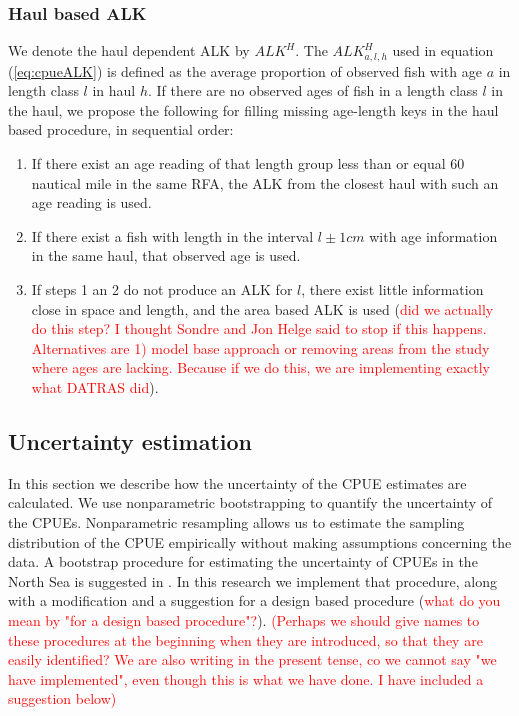 \documentclass[a4paper 12pt]{article}
\numberwithin{equation}{section}
\newcommand{\ed}[1]{\textcolor{red}{#1}}
\begin{document}
\subsubsection{Haul based ALK}
\label{sec:haulestimator}
We denote the haul dependent ALK  by  $ALK^{H}$. The $ALK^{H}_{a,l,h}$  used in equation (\ref{eq:cpueALK}) is defined as the average proportion of observed fish with age $a$ in  length class $l$ in haul $h$. If there are no observed ages of fish in a length class $l$ in the haul, we propose the following for filling missing age-length keys in the  haul based procedure, in sequential order:
\begin{enumerate}
\item If there exist an age reading of that length group less than or equal 60 nautical mile in the same RFA, the ALK from the closest haul with such an age reading is used.
\item If there exist a fish with length in the interval $l\pm 1cm$ with age information in the same haul, that observed age is used.  
\item If steps 1 an 2 do not produce an ALK for $l$, there exist little information close in space and length, and the area based ALK is used (\ed{did we actually do this step? I thought Sondre and Jon Helge said to stop if this happens. Alternatives are 1) model base approach or removing areas from the study where ages are lacking. Because if we do this, we are implementing exactly what DATRAS did}).
\end{enumerate}


\subsection{Uncertainty estimation}
\label{sec:uncertaintyestimation}
In this section we describe how the uncertainty of the CPUE estimates are calculated. We use nonparametric bootstrapping to quantify the uncertainty of the CPUEs. Nonparametric resampling allows us to estimate the sampling distribution of the CPUE empirically without making assumptions concerning the data.  A bootstrap procedure for estimating the uncertainty of CPUEs in the North Sea is suggested in \citet{ICES2006Report}. In this research we implement that procedure, along with a modification and a suggestion for a design based procedure (\ed{what do you mean by "for a design based procedure"?}). \ed{(Perhaps we should give names to these procedures at the beginning when they are introduced, so that they are easily identified? We are also writing in the present tense, co we cannot say "we have implemented", even though this is what we have done. I have included a suggestion below)}
\end{document}
